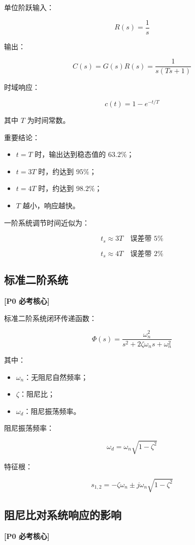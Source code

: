 \documentclass[UTF8,a4paper,12pt]{ctexart}
\newcommand{\Pzero}{\textcolor{p0}{\textbf{[P0 必考核心]}}}
\begin{document}
单位阶跃输入：

\[
R(s)=\frac{1}{s}
\]

输出：

\[
C(s)=G(s)R(s)=\frac{1}{s(Ts+1)}
\]

时域响应：

\[
c(t)=1-e^{-t/T}
\]

其中 $T$ 为时间常数。

重要结论：

\begin{itemize}
    \item $t=T$ 时，输出达到稳态值的 $63.2\%$；
    \item $t=3T$ 时，约达到 $95\%$；
    \item $t=4T$ 时，约达到 $98.2\%$；
    \item $T$ 越小，响应越快。
\end{itemize}

一阶系统调节时间近似为：

\[
t_s \approx 3T \quad \text{误差带 }5\%
\]

\[
t_s \approx 4T \quad \text{误差带 }2\%
\]

\subsection{标准二阶系统}

\Pzero

标准二阶系统闭环传递函数：

\[
\Phi(s)=\frac{\omega_n^2}{s^2+2\zeta\omega_ns+\omega_n^2}
\]

其中：

\begin{itemize}
    \item $\omega_n$：无阻尼自然频率；
    \item $\zeta$：阻尼比；
    \item $\omega_d$：阻尼振荡频率。
\end{itemize}

阻尼振荡频率：

\[
\omega_d=\omega_n\sqrt{1-\zeta^2}
\]

特征根：

\[
s_{1,2}=-\zeta\omega_n \pm j\omega_n\sqrt{1-\zeta^2}
\]

\subsection{阻尼比对系统响应的影响}

\Pzero
\end{document}
